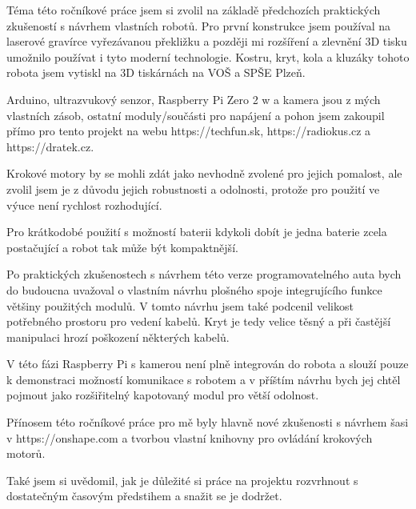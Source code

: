 \documentclass[12pt]{article}
\begin{document}
\begin{spacing}{1.5}
	Téma této ročníkové práce jsem si zvolil na základě předchozích praktických zkušeností s návrhem vlastních robotů. Pro první konstrukce jsem používal na laserové gravírce vyřezávanou překližku a později mi rozšíření a zlevnění 3D tisku umožnilo používat i tyto moderní technologie. 
	Kostru, kryt, kola a kluzáky tohoto robota jsem vytiskl na 3D tiskárnách na VOŠ a SPŠE Plzeň.
	
	Arduino, ultrazvukový senzor, Raspberry Pi Zero 2 w a kamera jsou z mých vlastních zásob, ostatní moduly/součásti pro napájení a pohon jsem zakoupil přímo pro tento projekt na webu https://techfun.sk, https://radiokus.cz a https://dratek.cz.
	
	Krokové motory by se mohli zdát jako nevhodně zvolené pro jejich pomalost, ale zvolil jsem je z důvodu jejich robustnosti a odolnosti, protože pro použití ve výuce není rychlost rozhodující.
	
	Pro krátkodobé použití s možností baterii kdykoli dobít je jedna baterie zcela postačující a robot tak může být kompaktnější.
	
	Po praktických zkušenostech s návrhem této verze programovatelného auta bych do budoucna uvažoval o vlastním návrhu plošného spoje integrujícího funkce většiny použitých modulů. V tomto návrhu jsem také podcenil velikost potřebného prostoru pro vedení kabelů. Kryt je tedy velice těsný a při častější manipulaci hrozí poškození některých kabelů.
	
	V této fázi Raspberry Pi s kamerou není plně integrován do robota a slouží pouze k demonstraci možností komunikace s robotem a v příštím návrhu bych jej chtěl pojmout jako rozšiřitelný kapotovaný modul pro větší odolnost.
	
	Přínosem této ročníkové práce pro mě byly hlavně nové zkušenosti s návrhem šasi v https://onshape.com a tvorbou vlastní knihovny pro ovládání krokových motorů.
	
	Také jsem si uvědomil, jak je důležité si práce na projektu rozvrhnout s dostatečným časovým předstihem a snažit se je dodržet.
	

\end{spacing}
\end{document}

